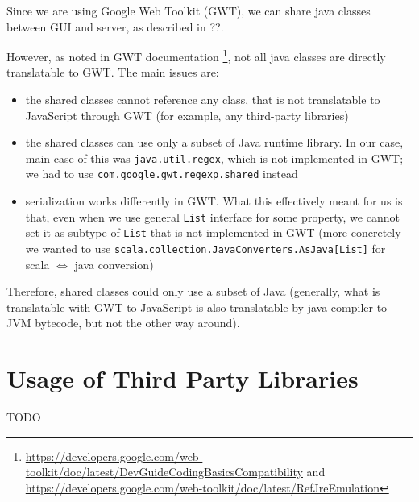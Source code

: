 Since we are using Google Web Toolkit (GWT), we can share java classes between GUI and server, as described in ??.

However, as noted in GWT documentation \footnote{\url{https://developers.google.com/web-toolkit/doc/latest/DevGuideCodingBasicsCompatibility} and \url{https://developers.google.com/web-toolkit/doc/latest/RefJreEmulation}}, not all java classes are directly translatable to GWT. The main issues are:

\begin{itemize}
\item the shared classes cannot reference any class, that is not translatable to JavaScript through GWT (for example, any third-party libraries)
\item the shared classes can use only a subset of Java runtime library. In our case, main case of this was \texttt{java.util.regex}, which is not implemented in GWT; we had to use \texttt{com.google.gwt.regexp.shared} instead
\item serialization works differently in GWT. What this effectively meant for us is that, even when we use general \texttt{List} interface for some property, we cannot set it as subtype of \texttt{List} that is not implemented in GWT (more concretely -- we wanted to use \texttt{scala.collection.JavaConverters.AsJava[List]} for scala $\Leftrightarrow$ java conversion)
\end{itemize}

Therefore, shared classes could only use a subset of Java (generally, what is translatable with GWT to JavaScript is also translatable by java compiler to JVM bytecode, but not the other way around).

\section{Usage of Third Party Libraries}

TODO 

